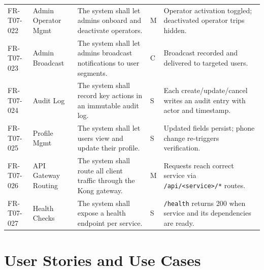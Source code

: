 \documentclass[11pt,a4paper]{article}
\begin{document}
\begin{longtable}{p{1.9cm} p{2.2cm} Y p{0.9cm} Y}
FR-T07-022 & Admin Operator Mgmt & The system shall let admins onboard and deactivate operators. & M & Operator activation toggled; deactivated operator trips hidden. \\
FR-T07-023 & Admin Broadcast & The system shall let admins broadcast notifications to user segments. & C & Broadcast recorded and delivered to targeted users. \\
FR-T07-024 & Audit Log & The system shall record key actions in an immutable audit log. & S & Each create/update/cancel writes an audit entry with actor and timestamp. \\
FR-T07-025 & Profile Mgmt & The system shall let users view and update their profile. & S & Updated fields persist; phone change re-triggers verification. \\
FR-T07-026 & API Gateway Routing & The system shall route all client traffic through the Kong gateway. & M & Requests reach correct service via \texttt{/api/<service>/*} routes. \\
FR-T07-027 & Health Checks & The system shall expose a health endpoint per service. & S & \texttt{/health} returns 200 when service and its dependencies are ready. \\
\bottomrule
\end{longtable}

\section{User Stories and Use Cases}
\end{document}
